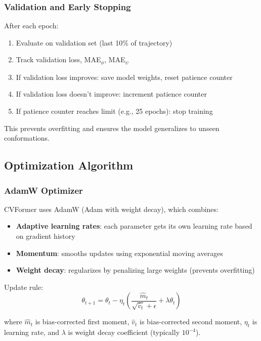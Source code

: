 \documentclass[12pt,a4paper]{article}
\begin{document}
\subsubsection{Validation and Early Stopping}
After each epoch:
\begin{enumerate}
    \item Evaluate on validation set (last 10\% of trajectory)
    \item Track validation loss, MAE$_\phi$, MAE$_\psi$
    \item If validation loss improves: save model weights, reset patience counter
    \item If validation loss doesn't improve: increment patience counter
    \item If patience counter reaches limit (e.g., 25 epochs): stop training
\end{enumerate}

This prevents overfitting and ensures the model generalizes to unseen conformations.

\subsection{Optimization Algorithm}

\subsubsection{AdamW Optimizer}
CVFormer uses AdamW (Adam with weight decay), which combines:
\begin{itemize}
    \item \textbf{Adaptive learning rates}: each parameter gets its own learning rate based on gradient history
    \item \textbf{Momentum}: smooths updates using exponential moving averages
    \item \textbf{Weight decay}: regularizes by penalizing large weights (prevents overfitting)
\end{itemize}

Update rule:
\begin{equation}
\theta_{t+1} = \theta_t - \eta_t \left(\frac{\hat{m}_t}{\sqrt{\hat{v}_t} + \epsilon} + \lambda \theta_t\right)
\end{equation}

where $\hat{m}_t$ is bias-corrected first moment, $\hat{v}_t$ is bias-corrected second moment, $\eta_t$ is learning rate, and $\lambda$ is weight decay coefficient (typically $10^{-4}$).
\end{document}
